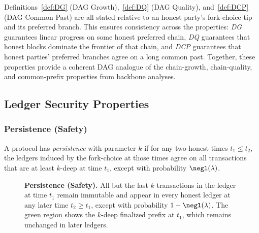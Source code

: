 \begin{remark}
Definitions~\ref{def:DG} (DAG Growth),~\ref{def:DQ} (DAG Quality), and~\ref{def:DCP} (DAG Common Past) are all stated relative to an honest party’s fork-choice tip and its preferred branch. This ensures consistency across the properties: \emph{DG} guarantees linear progress on some honest preferred chain, \emph{DQ} guarantees that honest blocks dominate the frontier of that chain, and \emph{DCP} guarantees that honest parties’ preferred branches agree on a long common past. Together, these properties provide a coherent DAG analogue of the chain-growth, chain-quality, and common-prefix properties from backbone analyses.
\end{remark}



\newpage
\subsection{Ledger Security Properties}

\subsubsection{Persistence (Safety)}
A protocol has \emph{persistence} with parameter $k$ if for any two honest times $t_1\le t_2$,
the ledgers induced by the fork-choice at those times agree on all transactions that are at least $k$-deep at time $t_1$,
except with probability $\negl(\lambda)$.


\begin{figure}[htp!]
\centering
{}
\caption{\textbf{Persistence (Safety).} 
\small 
All but the last $k$ transactions in the ledger at time $t_1$ remain immutable and appear in every honest ledger at any later time $t_2\ge t_1$, except with probability $1-\negl(\lambda)$. 
The green region shows the $k$-deep finalized prefix at $t_1$, which remains unchanged in later ledgers.}

\label{fig:persistence}
\end{figure}

